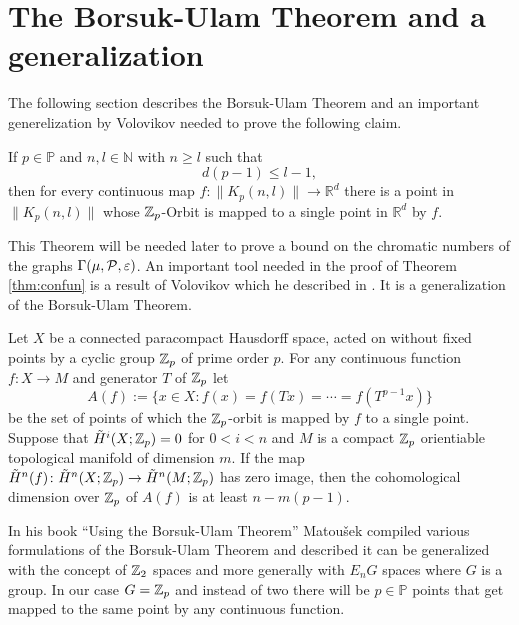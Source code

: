 \section{The Borsuk-Ulam Theorem and a generalization}\label{sec:borsuk}

The following section describes the Borsuk-Ulam Theorem and an important generelization by Volovikov needed to prove the following claim.
\begin{thm}\label{thm:confun}
  If $p \in \mathbb{P}$ and $n, l \in \mathbb{N}$ with $n \geq l$ such that
  \begin{equation*}
    d(p-1) \leq l-1,
  \end{equation*}
  then for every continuous map $f\colon\lVert K_p(n,l)\rVert \to \mathbb{R}^d$ there is a point in $\lVert K_p(n,l)\rVert$ whose $\Z_p$-Orbit is mapped to a single point in $\mathbb{R}^d$ by $f$.
\end{thm}
This Theorem will be needed later to prove a bound on the chromatic numbers of the graphs $\Gamma(\mu, \P, \varepsilon)$.
An important tool needed in the proof of Theorem \ref{thm:confun} is a result of Volovikov which he described in \cite{vol1980}. It is a generalization of the Borsuk-Ulam Theorem.
\begin{lemma}\label{lem:vol}
  Let $X$ be a connected paracompact Hausdorff space, acted on without fixed points by a cyclic group $\Z_p$ of prime order $p$. For any continuous function $f\colon X \to M$ and generator $T$ of $\Z_p$ let
  \begin{equation*}
    A(f) := \{x\in X\colon f(x) = f(Tx) = \cdots = f(T^{p-1}x)\}
  \end{equation*}
  be the set of points of which the $\Z_p$-orbit is mapped by $f$ to a single point. Suppose that $\tilde{H}^i(X; \Z_p) = 0$ for $0 < i < n$ and $M$ is a compact $\Z_p$ orientiable topological manifold of dimension $m$. If the map $\tilde{H}^n(f)\colon \tilde{H}^n(X; \Z_p) \to \tilde{H}^n(M; \Z_p)$ has zero image, then the cohomological dimension over $\Z_p$ of $A(f)$ is at least $n-m(p-1)$. 
\end{lemma}

In his book ``Using the Borsuk-Ulam Theorem'' \cite{using2003} Matoušek compiled various formulations of the Borsuk-Ulam Theorem and described it can be generalized with the concept of $\Z_2$ spaces and more generally with $E_nG$ spaces where $G$ is a group. In our case $G = \Z_p$ and instead of two there will be $p \in \mathbb{P}$ points that get mapped to the same point by any continuous function. 


